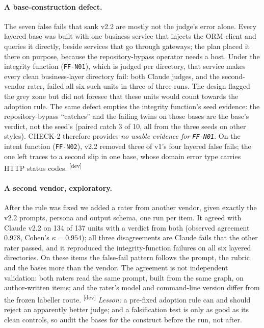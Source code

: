 \documentclass[10pt,a4paper]{article}
\newcommand{\devset}{\textsuperscript{\textsf{\tiny[dev]}}}
\newcommand{\ff}[1]{\texttt{\small #1}}
\begin{document}
\paragraph{A base-construction defect.} The seven false fails that sank v2.2 are mostly not the judge's error alone.
Every layered base was built with one business service that injects the ORM client and queries it directly, beside
services that go through gateways; the plan placed it there on purpose, because the repository-bypass operator needs
a host. Under the integrity function (\ff{FF-N01}), which is judged per directory, that service makes every clean
business-layer directory fail: both Claude judges, and the second-vendor rater, failed all six such units in three of
three runs. The design flagged the grey zone but did not foresee that these units would count towards the adoption
rule. The same defect empties the integrity function's seed evidence: the repository-bypass ``catches'' and the
failing twins on those bases are the base's verdict, not the seed's (paired catch 3 of 10, all from the three seeds
on other styles). CHECK-2 therefore provides \emph{no usable evidence for \ff{FF-N01}}. On the intent function
(\ff{FF-N02}), v2.2 removed three of v1's four layered false fails; the one left traces to a second slip in one base,
whose domain error type carries HTTP status codes. \devset{}

\paragraph{A second vendor, exploratory.} After the rule was fixed we added a rater from another vendor, given exactly
the v2.2 prompts, persona and output schema, one run per item. It agreed with Claude v2.2 on 134 of 137 units with a
verdict from both (observed agreement 0.978, Cohen's $\kappa = 0.954$); all three disagreements are Claude fails that
the other rater passed, and it reproduced the integrity-function failures on all six layered directories. On these
items the false-fail pattern follows the prompt, the rubric and the bases more than the vendor. The agreement is not
independent validation: both raters read the same prompt, built from the same graph, on author-written items; and
the rater's model and command-line version differ from the frozen labeller route. \devset{}
\emph{Lesson:} a pre-fixed adoption rule can and should reject an apparently better judge; and a falsification test is
only as good as its clean controls, so audit the bases for the construct before the run, not after.
\end{document}
